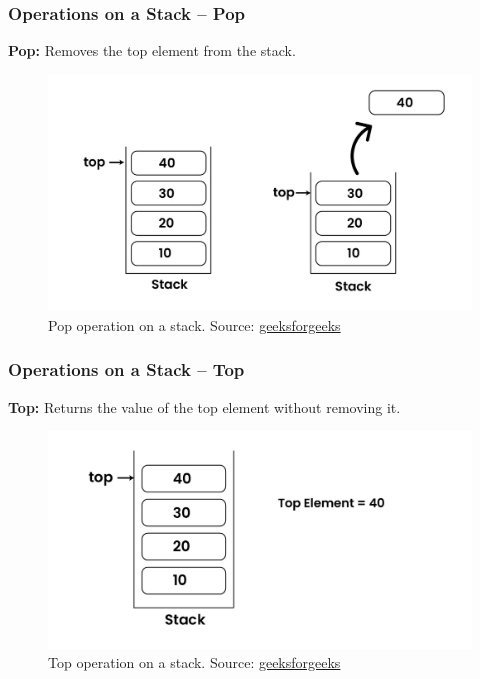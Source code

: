 \documentclass[10pt]{beamer}
\begin{document}
\begin{frame}\frametitle{Operations on a Stack – Pop}
    \textbf{Pop:} Removes the top element from the stack.
        \begin{figure}[h]
        \centering
        \includegraphics[width=1\textwidth]{img/pop.png}
        \caption{Pop operation on a stack. Source: \href{https://www.geeksforgeeks.org/introduction-to-stack-data-structure-and-algorithm-tutorials/}{geeksforgeeks}}
    \end{figure}
\end{frame}

\begin{frame}\frametitle{Operations on a Stack – Top}
    \textbf{Top:} Returns the value of the top element without removing it.
        \begin{figure}[h]
        \centering
        \includegraphics[width=1\textwidth]{img/top.png}
        \caption{Top operation on a stack. Source: \href{https://www.geeksforgeeks.org/introduction-to-stack-data-structure-and-algorithm-tutorials/}{geeksforgeeks}}
    \end{figure}
\end{frame}
\end{document}
